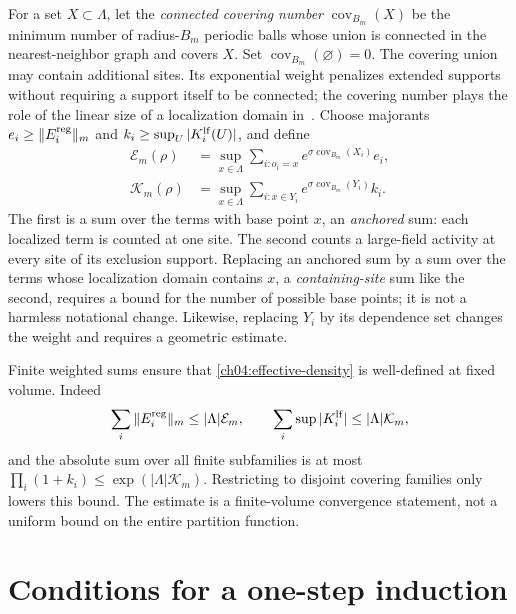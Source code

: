 For a set $X\subset\Lambda$, let the \emph{connected covering number} $\operatorname{cov}_{B_m}(X)$ be the
minimum number of radius-$B_m$ periodic balls whose union is connected
in the nearest-neighbor graph and covers $X$. Set $\operatorname{cov}_{B_m}(\varnothing)=0$. The covering union may
contain additional sites. Its exponential weight penalizes extended
supports without requiring a support itself to be connected; the covering number plays the role of the linear size of a localization domain in~\cite{Balaban1987RG}.
Choose majorants $e_i\ge\|E_i^{\rm reg}\|_m$ and
$k_i\ge\sup_U|K_i^{\rm lf}(U)|$, and define
\begin{equation}
 \begin{split}
 \mathcal E_m(\rho)&=\sup_{x\in\Lambda}
     \sum_{i:o_i=x}e^{\sigma\operatorname{cov}_{B_m}(X_i)}e_i,\\
 \mathcal K_m(\rho)&=\sup_{x\in\Lambda}
     \sum_{i:x\in Y_i}e^{\sigma\operatorname{cov}_{B_m}(Y_i)}k_i.
 \end{split}
 \label{ch04:weighted-sums}
\end{equation}
The first is a sum over the terms with base point $x$, an \emph{anchored} sum: each localized term is counted at one
site. The second counts a large-field activity at every site of its
exclusion support. Replacing an anchored sum by a sum over the terms whose localization domain contains $x$, a \emph{containing-site} sum like the second,
requires a bound for the number of possible base points; it is not a harmless
notational change. Likewise, replacing $Y_i$ by its dependence set
changes the weight and requires a geometric estimate.

Finite weighted sums ensure that \eqref{ch04:effective-density} is
well-defined at fixed volume. Indeed
\[
 \sum_i\|E_i^{\rm reg}\|_m\le|\Lambda|\mathcal E_m,\qquad
 \sum_i\sup|K_i^{\rm lf}|\le|\Lambda|\mathcal K_m,
\]
and the absolute sum over all finite subfamilies is at most
$\prod_i(1+k_i)\le\exp(|\Lambda|\mathcal K_m)$.
Restricting to disjoint covering families only lowers this bound. The estimate
is a finite-volume convergence statement, not a uniform bound on the
entire partition function.

\section{Conditions for a one-step induction}
\label{ch04:admissibility}

